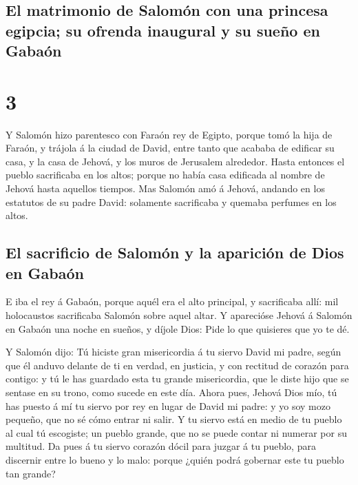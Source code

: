 \hypertarget{el-matrimonio-de-salomuxf3n-con-una-princesa-egipcia-su-ofrenda-inaugural-y-su-sueuxf1o-en-gabauxf3n}{%
\subsection{El matrimonio de Salomón con una princesa egipcia; su
ofrenda inaugural y su sueño en
Gabaón}\label{el-matrimonio-de-salomuxf3n-con-una-princesa-egipcia-su-ofrenda-inaugural-y-su-sueuxf1o-en-gabauxf3n}}

\hypertarget{section-2}{%
\section{3}\label{section-2}}

 Y Salomón hizo parentesco con Faraón rey de Egipto,
porque tomó la hija de Faraón, y trájola á la ciudad de David, entre
tanto que acababa de edificar su casa, y la casa de Jehová, y los muros
de Jerusalem alrededor.  Hasta entonces el pueblo
sacrificaba en los altos; porque no había casa edificada al nombre de
Jehová hasta aquellos tiempos.  Mas Salomón amó á Jehová,
andando en los estatutos de su padre David: solamente sacrificaba y
quemaba perfumes en los altos.

\hypertarget{el-sacrificio-de-salomuxf3n-y-la-apariciuxf3n-de-dios-en-gabauxf3n}{%
\subsection{El sacrificio de Salomón y la aparición de Dios en
Gabaón}\label{el-sacrificio-de-salomuxf3n-y-la-apariciuxf3n-de-dios-en-gabauxf3n}}

 E iba el rey á Gabaón, porque aquél era el alto
principal, y sacrificaba allí: mil holocaustos sacrificaba Salomón sobre
aquel altar.  Y aparecióse Jehová á Salomón en Gabaón una
noche en sueños, y díjole Dios: Pide lo que quisieres que yo te dé.

 Y Salomón dijo: Tú hiciste gran misericordia á tu siervo
David mi padre, según que él anduvo delante de ti en verdad, en
justicia, y con rectitud de corazón para contigo: y tú le has guardado
esta tu grande misericordia, que le diste hijo que se sentase en su
trono, como sucede en este día.  Ahora pues, Jehová Dios
mío, tú has puesto á mí tu siervo por rey en lugar de David mi padre: y
yo soy mozo pequeño, que no sé cómo entrar ni salir.  Y tu
siervo está en medio de tu pueblo al cual tú escogiste; un pueblo
grande, que no se puede contar ni numerar por su multitud.
 Da pues á tu siervo corazón dócil para juzgar á tu
pueblo, para discernir entre lo bueno y lo malo: porque ¿quién podrá
gobernar este tu pueblo tan grande?

